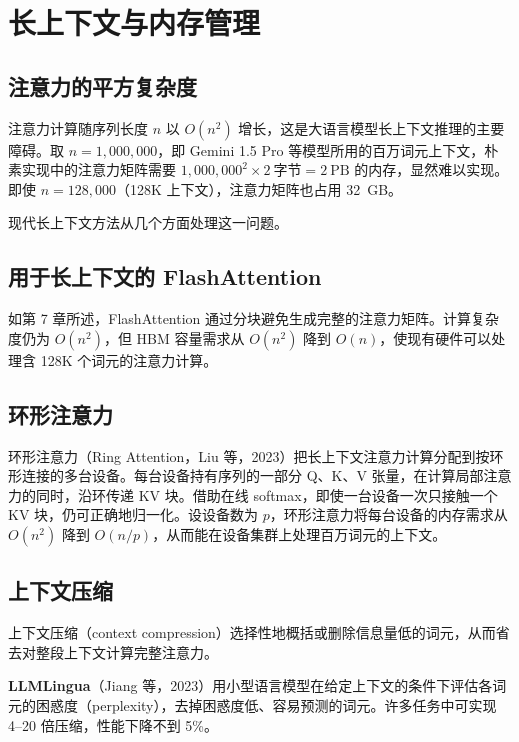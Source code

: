 
\chapter{长上下文与内存管理}

\section{注意力的平方复杂度}

注意力计算随序列长度 \(n\) 以 \(O(n^2)\) 增长，这是大语言模型长上下文推理的主要障碍。取 \mbox{\(n=1{,}000{,}000\)}，即 Gemini 1.5 Pro 等模型所用的百万词元上下文，朴素实现中的注意力矩阵需要 \(1{,}000{,}000^2\times 2~\text{字节}=2~\text{PB}\) 的内存，显然难以实现。即使 \(n=128{,}000\)（128K 上下文），注意力矩阵也占用 32~GB。

现代长上下文方法从几个方面处理这一问题。

\section{用于长上下文的 FlashAttention}

如第 7 章所述，FlashAttention 通过分块避免生成完整的注意力矩阵。计算复杂度仍为 \(O(n^2)\)，但 HBM 容量需求从 \(O(n^2)\) 降到 \(O(n)\)，使现有硬件可以处理含 128K 个词元的注意力计算。

\section{环形注意力}

环形注意力（Ring Attention，Liu 等，2023）把长上下文注意力计算分配到按环形连接的多台设备。每台设备持有序列的一部分 Q、K、V 张量，在计算局部注意力的同时，沿环传递 KV 块。借助在线 softmax，即使一台设备一次只接触一个 KV 块，仍可正确地归一化。设设备数为 \(p\)，环形注意力将每台设备的内存需求从 \(O(n^2)\) 降到 \(O(n/p)\)，从而能在设备集群上处理百万词元的上下文。

\section{上下文压缩}

上下文压缩（context compression）选择性地概括或删除信息量低的词元，从而省去对整段上下文计算完整注意力。

\textbf{LLMLingua}（Jiang 等，2023）用小型语言模型在给定上下文的条件下评估各词元的困惑度（perplexity），去掉困惑度低、容易预测的词元。许多任务中可实现 4–20 倍压缩，性能下降不到 5\%。

